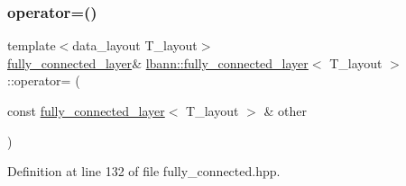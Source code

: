 \subsubsection{\texorpdfstring{operator=()}{operator=()}}
{\footnotesize\ttfamily template$<$data\+\_\+layout T\+\_\+layout$>$ \\
\hyperlink{classlbann_1_1fully__connected__layer}{fully\+\_\+connected\+\_\+layer}\& \hyperlink{classlbann_1_1fully__connected__layer}{lbann\+::fully\+\_\+connected\+\_\+layer}$<$ T\+\_\+layout $>$\+::operator= (\begin{DoxyParamCaption}\item[{const \hyperlink{classlbann_1_1fully__connected__layer}{fully\+\_\+connected\+\_\+layer}$<$ T\+\_\+layout $>$ \&}]{other }\end{DoxyParamCaption})\hspace{0.3cm}{\ttfamily [inline]}}



Definition at line 132 of file fully\+\_\+connected.\+hpp.


